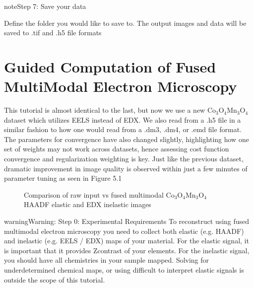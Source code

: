 \documentclass[letterpaper,10pt,english]{jupyterBook}
\let\sphinxpxdimen\pdfpxdimen\else\newdimen\sphinxpxdimen
\begin{document}
\begin{sphinxadmonition}{note}{Step 7: Save your data}

\sphinxAtStartPar
Define the folder you would like to save to. The output images and data will be saved to .tif and .h5 file formats
\end{sphinxadmonition}

\sphinxstepscope


\chapter{Guided Computation of Fused Multi\sphinxhyphen{}Modal Electron Microscopy}
\label{\detokenize{04_multi_modal_2:guided-computation-of-fused-multi-modal-electron-microscopy}}\label{\detokenize{04_multi_modal_2::doc}}
\sphinxAtStartPar
This tutorial is almost identical to the last, but now we use a new Co\(_3\)O\(_4\)\sphinxhyphen{}Mn\(_3\)O\(_4\) dataset which utilizes EELS instead of EDX. We also read from a .h5 file in a similar fashion to how one would read from a .dm3, .dm4, or .emd file format. The parameters for convergence have also changed slightly, highlighting how one set of weights may not work across datasets, hence assessing cost function convergence and regularization weighting is key. Just like the previous dataset, dramatic improvement in image quality is observed within just a few minutes of parameter tuning as seen in Figure 5.1

\begin{figure}[htbp]
\centering
\capstart

\noindent\sphinxincludegraphics[width=700\sphinxpxdimen]{{Figure_6_Output_2}.png}
\caption{Comparison of raw input vs fused multi\sphinxhyphen{}modal Co\(_3\)O\(_4\)\sphinxhyphen{}Mn\(_3\)O\(_4\) HAADF elastic and EDX inelastic images}\label{\detokenize{04_multi_modal_2:raw-vs-fused-co-3-o-4-mn-3-o-4}}\end{figure}

\begin{sphinxadmonition}{warning}{Warning:}
\sphinxAtStartPar
Step 0: Experimental Requirements
To reconstruct using fused multi\sphinxhyphen{}modal electron microscopy you need to collect both elastic (e.g. HAADF) and inelastic (e.g. EELS / EDX) maps of your material. For the elastic signal, it is important that it provides Z\sphinxhyphen{}contrast of your elements. For the inelastic signal, you should have all chemistries in your sample mapped. Solving for under\sphinxhyphen{}determined chemical maps, or using difficult to interpret elastic signals is outside the scope of this tutorial.
\end{sphinxadmonition}
\end{document}
